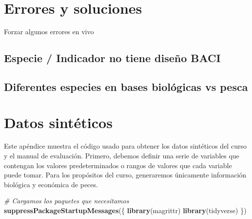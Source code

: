 \documentclass[]{krantz}
\newenvironment{Shaded}{\begin{snugshade}}{\end{snugshade}}
\newcommand{\CommentTok}[1]{\textcolor[rgb]{0.56,0.35,0.01}{\textit{#1}}}
\newcommand{\KeywordTok}[1]{\textcolor[rgb]{0.13,0.29,0.53}{\textbf{#1}}}
\newcommand{\NormalTok}[1]{#1}
\begin{document}
\hypertarget{errores-y-soluciones}{%
\chapter{Errores y soluciones}\label{errores-y-soluciones}}

Forzar algunos errores en vivo

\hypertarget{especie-indicador-no-tiene-diseno-baci}{%
\section{Especie / Indicador no tiene diseño BACI}\label{especie-indicador-no-tiene-diseno-baci}}

\hypertarget{diferentes-especies-en-bases-biologicas-vs-pesca}{%
\section{Diferentes especies en bases biológicas vs pesca}\label{diferentes-especies-en-bases-biologicas-vs-pesca}}

\hypertarget{appendix-appendice}{%
\appendix {}}


\hypertarget{datos-sinteticos}{%
\chapter{Datos sintéticos}\label{datos-sinteticos}}

Este apéndice muestra el código usado para obtener los datos sintéticos del curso y el manual de evaluación. Primero, debemos definir una serie de variables que contengan los valores predeterminados o rangos de valores que cada variable puede tomar. Para los propósitos del curso, generaremos únicamente información biológica y económica de peces.

\begin{Shaded}
\begin{Highlighting}[]
\CommentTok{# Cargamos los paquetes que necesitamos}
\KeywordTok{suppressPackageStartupMessages}\NormalTok{(\{}
  \KeywordTok{library}\NormalTok{(magrittr)}
  \KeywordTok{library}\NormalTok{(tidyverse)}
\NormalTok{\})}
\end{Highlighting}
\end{Shaded}
\end{document}
